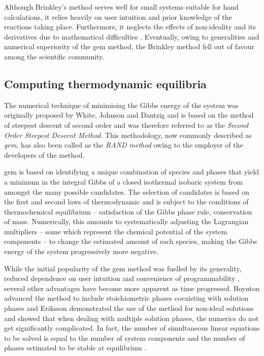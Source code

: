 	Although Brinkley's method serves well for small systems suitable for hand calculations, it relies heavily on user intuition and prior knowledge of the reactions taking place. Furthermore, it neglects the effects of non-ideality and its derivatives due to mathematical difficulties \cite{Zeleznik:1968aa}. Eventually, owing to generalities and numerical superiority of the \gls{gem} method, the Brinkley method fell out of favour among the scientific community.

	\subsection{Computing thermodynamic equilibria}
	The numerical technique of minimising the Gibbs energy of the system was originally proposed by White, Johnson and Dantzig \cite{White:58} and is based on the method of steepest descent of second order and was therefore referred to as the \emph{Second Order Steepest Descent Method}. This methodology, now commonly described as \emph{\gls{gem}}, has also been called as the \emph{RAND method} owing to the employer of the developers of the method.

	\gls{gem} is based on identifying a unique combination of species and phases that yield a minimum in the integral Gibbs of a closed isothermal isobaric system from amongst the many possible candidates. The selection of candidates is based on the first and second laws of thermodynamic and is subject to the conditions of thermochemical equilibrium -- satisfaction of the Gibbs phase rule, conservation of mass. Numerically, this amounts to systematically adjusting the Lagrangian multipliers -- some which represent the chemical potential of the system components -- to change the estimated amount of each species, making the Gibbs energy of the system progressively more negative.

	While the initial popularity of the \gls{gem} method was fuelled by its generality,  reduced dependence on user intuition and convenience of programmability \cite{Zeleznik:1968aa}, several other advantages have become more apparent as time progressed. Boynton advanced the method to include stoichiometric phases coexisting with solution phases \cite{Boynton:1960aa} and Eriksson \cite{Eriksson:1975aa} demonstrated the use of the method for non-ideal solutions and showed that when dealing with multiple solution phases, the numerics do not get significantly complicated. In fact, the number of simultaneous linear equations to be solved is equal to the number of system components and the number of phases estimated to be stable at equilibrium \cite{vanZeggeren11,Boynton:1960aa,Eriksson:1975aa,Eriksson73}.

